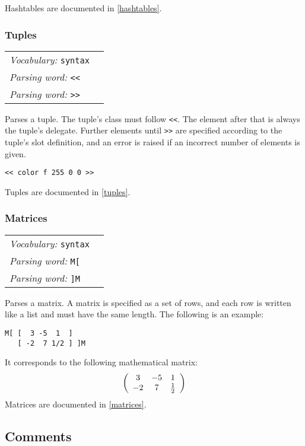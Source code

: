 \documentclass{book}
\newcommand{\vocabulary}[1]{\emph{Vocabulary:} \texttt{#1}&\\}
\newcommand{\parsingword}[2]{\index{\texttt{#1}}\emph{Parsing word:} \texttt{#2}&\\}
\newcommand{\wordtable}[1]{


\begin{tabularx}{12cm}{lX}
\hline
#1
\hline
\end{tabularx}

}
\begin{document}
Hashtables are documented in \ref{hashtables}.

\subsubsection{Tuples}
\newcommand{\tupleglos}{}
\tupleglos
\wordtable{
\vocabulary{syntax}
\parsingword{<<}{<<}
\parsingword{>>}{>>}
}
Parses a tuple. The tuple's class must follow \texttt{<<}. The element after that is always the tuple's delegate. Further elements until \texttt{>>} are specified according to the tuple's slot definition, and an error is raised if an incorrect number of elements is given.
\begin{verbatim}
<< color f 255 0 0 >>
\end{verbatim}

Tuples are documented in \ref{tuples}.

\subsubsection{\label{syntax:matrices}Matrices}
\newcommand{\matrixglos}{}
\matrixglos
\wordtable{
\vocabulary{syntax}
\parsingword{M[}{M[}
\parsingword{]M}{]M}
}
Parses a matrix. A matrix is specified as a set of rows, and each row is written like a list and must have the same length. The following is an example:
\begin{verbatim}
M[ [  3 -5  1  ]
   [ -2  7 1/2 ] ]M
\end{verbatim}
It corresponds to the following mathematical matrix:
$$\left( \begin{array}{c c c}
3 & -5 & 1 \\
-2 & 7 & \frac{1}{2}
\end{array} \right)$$
Matrices are documented in \ref{matrices}.

\subsection{\label{comments}Comments}
\end{document}
